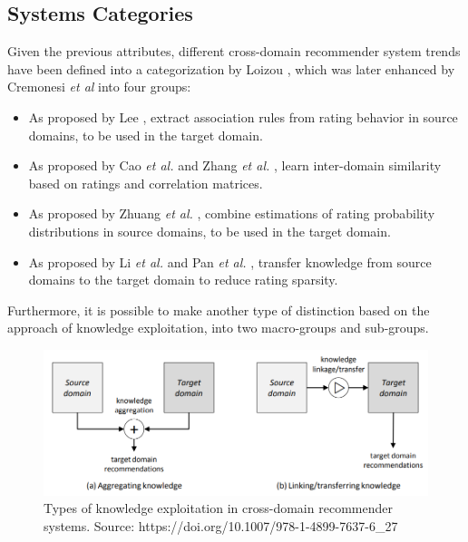 \subsection{Systems Categories}

Given the previous attributes, different cross-domain recommender system trends have been defined into a categorization by Loizou \cite{crossdomain-recsys-categorization}, which was later enhanced by Cremonesi \textit{et al} \cite{crossdomain-recsys-categorization} into four groups:
\begin{itemize}
\item As proposed by Lee \cite{10.1016/S0957-41740100034-3}, extract association rules from rating behavior in source domains, to be used in the target domain.
\item As proposed by Cao \textit{et al.} \cite{10.5555/3104322.3104344} and Zhang \textit{et al.} \cite{10.5555/3023549.3023635}, learn inter-domain similarity based on ratings and correlation matrices.
\item As proposed by Zhuang \textit{et al.} \cite{10.1109/TKDE.2009.205}, combine estimations of rating probability distributions in source domains, to be used in the target domain.
\item As proposed by Li \textit{et al.} \cite{10.5555/1661445.1661773, 10.1145/1553374.1553454} and Pan \textit{et al.} \cite{10.5555/2283696.2283784, 10.5555/2898607.2898644}, transfer knowledge from source domains to the target domain to reduce rating sparsity.
\end{itemize}
Furthermore, it is possible to make another type of distinction based on the approach of knowledge exploitation, into two macro-groups and sub-groups.
\begin{figure}[hbt!]
  \centering
  \includegraphics[width=\textwidth]{pictures/knowledge-exploitation}
  \caption{Types of knowledge exploitation in cross-domain recommender systems. Source: https://doi.org/10.1007/978-1-4899-7637-6\_27}
\end{figure}
